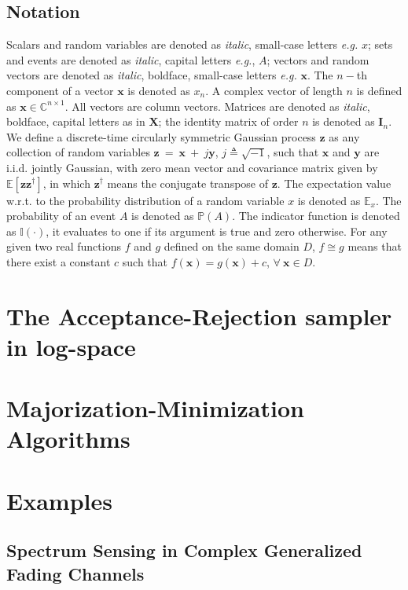 \documentclass[conference, 10pt]{IEEEtran}
\begin{document}
\subsection*{Notation}
Scalars and random variables are denoted as \textit{italic}, small-case letters
\textit{e.g.} $x$; sets and events are denoted as \textit{italic}, capital
letters \textit{e.g.}, $A$; vectors and random vectors are denoted as
\textit{italic}, boldface, small-case letters \textit{e.g.} $\bm{x}$. The $n-$th
component of a vector $\bm{x}$ is denoted as $x_n$. A complex vector of length
$n$ is defined as $\bm{x} \in \mathbb{C}^{n\times 1}$. All vectors are column
vectors. Matrices are denoted as \textit{italic}, boldface, capital letters as
in $\bm{X}$; the identity matrix of order $n$ is denoted as $\bm{I}_n$. We
define a discrete-time circularly symmetric Gaussian process $\bm{z}$ as any
collection of random variables $\bm{z}~=~\bm{x}~+~j\bm{y}$,
$j \triangleq \sqrt{-1}$, such that $\bm{x}$ and $\bm{y}$ are i.i.d. jointly
Gaussian, with zero mean vector and covariance matrix given by
$\mathbb{E}\left[\bm{z}\bm{z}^{\dagger}\right]$, in which $\bm{z}^\dagger$ means
the conjugate transpose of $\bm{z}$. The expectation value w.r.t. to the
probability distribution of a random variable $x$ is denoted as $\mathbb{E}_x$.
The probability of an event $A$ is denoted as $\mathbb{P}(A)$. The indicator
function is denoted as $\mathbb{I}(\cdot)$, it evaluates to one if its argument
is true and zero otherwise. For any given two real functions $f$ and $g$ defined
on the same domain $D$, $f \cong g$ means that there exist a constant $c$ such that
$f(\bm{x}) = g(\bm{x}) + c$, $\forall~ \bm{x} \in D$.

\section{The Acceptance-Rejection sampler in log-space}

\section{Majorization-Minimization Algorithms}

\section{Examples}
\subsection{Spectrum Sensing in Complex Generalized Fading Channels}
\end{document}
